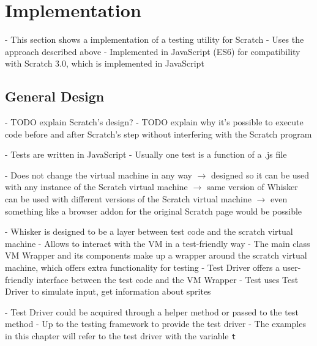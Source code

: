\chapter{Implementation}

- This section shows a implementation of a testing utility for Scratch
- Uses the approach described above
- Implemented in JavaScript (ES6) for compatibility with Scratch 3.0, which is implemented in JavaScript

\section{General Design}

- TODO explain Scratch's design?
- TODO explain why it's possible to execute code before and after Scratch's step without interfering with the Scratch program

- Tests are written in JavaScript
- Usually one test is a function of a .js file

- Does not change the virtual machine in any way
    $\rightarrow$ designed so it can be used with any instance of the Scratch virtual machine
    $\rightarrow$ same version of Whisker can be used with different versions of the Scratch virtual machine
    $\rightarrow$ even something like a browser addon for the original Scratch page would be possible

- Whisker is designed to be a layer between test code and the scratch virtual machine
- Allows to interact with the VM in a test-friendly way
- The main class VM Wrapper and its components make up a wrapper around the scratch virtual machine,
  which offers extra functionality for testing
- Test Driver offers a user-friendly interface between the test code and the VM Wrapper
- Test uses Test Driver to simulate input, get information about sprites

- Test Driver could be acquired through a helper method or passed to the test method
- Up to the testing framework to provide the test driver
- The examples in this chapter will refer to the test driver with the variable \texttt{t}

